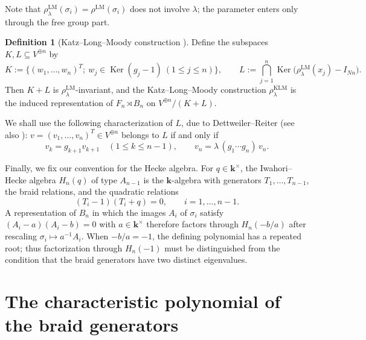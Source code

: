 \documentclass[11pt]{article}
\theoremstyle{definition}
\newtheorem{definition}[theorem]{Definition}
\theoremstyle{remark}
\newcommand{\Ker}{\operatorname{Ker}}
\newcommand{\kk}{\boldsymbol{k}}
\newcommand{\rLM}{\rho^{\mathrm{LM}}}
\newcommand{\rLMl}{\rho^{\mathrm{LM}}_{\lambda}}
\newcommand{\rKLM}{\rho^{\mathrm{KLM}}_{\lambda}}
\begin{document}
Note that $\rLMl(\sigma_i) = \rLM(\sigma_i)$ does not involve $\lambda$;
the parameter enters only through the free group part.

\begin{definition}[Katz--Long--Moody construction
\cite{HiroeNegami23}]\label{def:KLM}
Define the subspaces $K, L \subseteq V^{\oplus n}$ by
\[
K := \bigl\{(w_1, \dots, w_n)^{T} ;\ w_j \in \Ker(g_j - 1)\ (1 \le j \le n)
\bigr\},
\qquad
L := \bigcap_{j=1}^{n} \Ker\bigl(\rLMl(x_j) - I_{Nn}\bigr).
\]
Then $K + L$ is $\rLMl$-invariant, and the Katz--Long--Moody construction
$\rKLM$ is the induced representation of $F_n \rtimes B_n$ on
$V^{\oplus n} / (K + L)$.
\end{definition}

We shall use the following characterization of $L$, due to
Dettweiler--Reiter \cite[Section~2.1]{DettweilerReiter07} (see also
\cite[Eq.~(9)]{Negami25}):
$v = (v_1, \dots, v_n)^{T} \in V^{\oplus n}$ belongs to $L$ if and only if
\begin{equation}\label{eq:Lchar}
v_k = g_{k+1} v_{k+1} \quad (1 \le k \le n-1), \qquad
v_n = \lambda\,(g_1 \cdots g_n)\, v_n.
\end{equation}

Finally, we fix our convention for the Hecke algebra. For
$q \in \kk^{\times}$, the Iwahori--Hecke algebra $H_n(q)$ of type
$A_{n-1}$ is the $\kk$-algebra with generators $T_1, \dots, T_{n-1}$,
the braid relations, and the quadratic relations
\begin{equation}\label{eq:heckerel}
(T_i - 1)(T_i + q) = 0, \qquad i = 1, \dots, n-1.
\end{equation}
A representation of $B_n$ in which the images $A_i$ of $\sigma_i$ satisfy
$(A_i - a)(A_i - b) = 0$ with $a \in \kk^{\times}$ therefore factors
through $H_n(-b/a)$ after rescaling $\sigma_i \mapsto a^{-1} A_i$.
When $-b/a = -1$, the defining polynomial has a repeated root; thus
factorization through $H_n(-1)$ must be distinguished from the condition
that the braid generators have two distinct eigenvalues.

\section{The characteristic polynomial of the braid
generators}\label{sec:charpoly}
\end{document}
